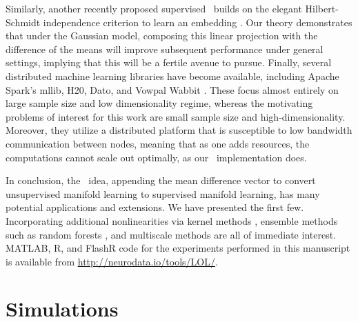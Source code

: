 \documentclass[10pt]{article}
\begin{document}
Similarly, another  recently proposed supervised \Pca~builds on the elegant Hilbert-Schmidt independence criterion \cite{Gretton05} to learn an embedding \cite{Barshan11a}.  Our theory demonstrates that under the Gaussian model, composing this linear projection with the difference of the means will improve subsequent performance under general settings, implying that this will be a fertile avenue to pursue.
%
Finally, several distributed machine learning libraries have become available, including Apache Spark's mllib,  H20, Dato, and Vowpal Wabbit \cite{??}.  These focus almost entirely on large sample size and low dimensionality regime, whereas the motivating problems of interest for this work are small sample size and high-dimensionality. Moreover, they utilize a distributed platform that is susceptible to low bandwidth communication between nodes, meaning that as one adds resources, the computations cannot scale out optimally, as our \Lol~implementation does.



%
In conclusion, the \Lol~idea, appending the mean difference vector to convert unsupervised manifold learning to supervised manifold learning, has many potential applications and extensions.  We have presented the first few.  Incorporating additional nonlinearities via kernel methods \cite{Mika1999a}, ensemble methods such as random forests \cite{Breiman2001a}, and multiscale methods \cite{Allard2012}
are all of immediate interest. 
MATLAB, R, and FlashR code for the experiments performed in this manuscript is available from \url{http://neurodata.io/tools/LOL/}.

\clearpage
\appendix

\section{Simulations}

\end{document}
